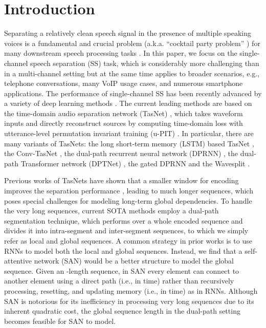 \documentclass{article}
\begin{document}
\section{Introduction}
\label{sec:intro}
Separating a relatively clean speech signal in the presence of multiple speaking voices is a fundamental and crucial problem (a.k.a. ``cocktail party problem'' \cite{cherry1953some,haykin2005cocktail}) for many downstream speech processing tasks \cite{narayanan2014investigation,lam2019extract,von2020end}. In this paper, we focus on the single-channel speech separation (SS) task, which is considerably more challenging than in a multi-channel setting but at the same time applies to broader scenarios, e.g., telephone conversations, many VoIP usage cases, and numerous smartphone applications. The performance of single-channel SS has been recently advanced by a variety of deep learning methods \cite{luo2018tasnet, luo2019conv, luo2019dual}. The current leading methods are based on the time-domain audio separation network (TasNet) \cite{luo2018tasnet}, which takes waveform inputs and directly reconstruct sources by computing time-domain loss with utterance-level permutation invariant training (u-PIT) \cite{yu2017permutation, kolbaek2017multitalker}. In particular, there are many variants of TasNets: the long short-term memory (LSTM) based TasNet \cite{luo2018tasnet}, the Conv-TasNet \cite{bai2018empirical, luo2019conv}, the dual-path recurrent neural network (DPRNN) \cite{luo2019dual}, the dual-path Transformer network (DPTNet) \cite{chen2020dual}, the gated DPRNN \cite{nachmani2020voice} and the Wavesplit \cite{zeghidour2020wavesplit}.
\par
Previous works of TasNets have shown that a smaller window for encoding improves the separation performance \cite{luo2019dual, chen2020dual, nachmani2020voice}, leading to much longer sequences, which poses special challenges for modeling long-term global dependencies.
To handle the very long sequences, current SOTA methods \cite{luo2019dual, chen2020dual, nachmani2020voice} employ a dual-path segmentation technique, which performs over a whole encoded sequence and divides it into intra-segment and inter-segment sequences, to which we simply refer as local and global sequences. A common strategy in prior works \cite{luo2019dual, chen2020dual, nachmani2020voice} is to use RNNs to model both the local and global sequences. Instead, we find that a self-attentive network (SAN) \cite{vaswani2017attention} would be a better structure to model the global sequence. Given an -length sequence, in SAN every element can connect to another element using a direct path (i.e., in  time) rather than recursively processing, resetting, and updating memory (i.e., in  time) as in RNNs. Although SAN is notorious for its inefficiency in processing very long sequences due to its inherent quadratic cost, the global sequence length in the dual-path setting becomes feasible for SAN to model.
\end{document}
